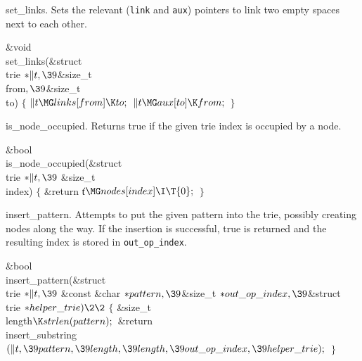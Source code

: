 set\_links.
Sets the relevant ({\tt link} and {\tt aux}) pointers to link two empty spaces
next to each other.

\Y\B\1\1\&{void} \\{set\_links}(\&{struct} \\{trie} ${}{*}\|t,\39{}$\&{size\_t}
\\{from}${},\39{}$\&{size\_t} \\{to})\2\2\6
${}\{{}$\1\6
${}\|t\MG\\{links}[\\{from}]\K\\{to};{}$\6
${}\|t\MG\\{aux}[\\{to}]\K\\{from};{}$\6
\4${}\}{}$\2\par
\fi

is\_node\_occupied.
Returns true if the given trie index is occupied by a node.

\Y\B\1\1\&{bool} \\{is\_node\_occupied}(\&{struct} \\{trie} ${}{*}\|t,\39{}$%
\&{size\_t} \\{index})\2\2\6
${}\{{}$\1\6
\&{return} \|t${}\MG\\{nodes}[\\{index}]\I\T{0};{}$\6
\4${}\}{}$\2\par
\fi

insert\_pattern.
Attempts to put the given pattern into the trie, possibly creating nodes along
the way. If the insertion is successful,
true is returned and the resulting index is stored in {\tt out\_op\_index}.

\Y\B\1\1\&{bool} \\{insert\_pattern}(\&{struct} \\{trie} ${}{*}\|t,\39{}$%
\&{const} \&{char} ${}{*}\\{pattern},\39{}$\&{size\_t} ${}{*}\\{out\_op%
\_index},\39{}$\&{struct} \\{trie} ${}{*}\\{helper\_trie})\2\2{}$\6
${}\{{}$\1\6
\&{size\_t} \\{length}${}\K\\{strlen}(\\{pattern});{}$\7
\&{return} \\{insert\_substring}${}(\|t,\39\\{pattern},\39\\{length},\39%
\\{length},\39\\{out\_op\_index},\39\\{helper\_trie});{}$\6
\4${}\}{}$\2\par
\fi


